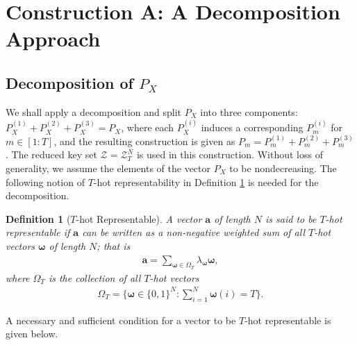 \documentclass[11pt,letterpaper]{article}
\newtheorem{definition}{\textbf{Definition}}%
\newcommand{\cZ}{\mathcal{Z}}
\begin{document}
\section{Construction A: A Decomposition Approach} \label{sec:construction_A}

\subsection{Decomposition of $P_X$}
We shall apply a decomposition and split $P_X$ into three components: $P_X^{(1)} + P_X^{(2)} + P_X^{(3)} = P_X$, where each $P_X^{(i)}$ induces a corresponding $P_m^{(i)}$ for $m \in [1:T]$, and the resulting construction is given as $P_m = P_m^{(1)} + P_m^{(2)} + P_m^{(3)}$. The reduced key set $\cZ = \cZ^N_T$ is used in this construction. Without loss of generality, we assume the elements of the vector $P_X$ to be nondecreasing. The following notion of $T$-hot representability in Definition \ref{def:T-hot-representable} is needed for the decomposition.

\begin{definition}[$T$-hot Representable] \label{def:T-hot-representable}
    A vector $\boldsymbol{a}$ of length $N$ is said to be $T$-hot representable if $\boldsymbol{a}$ can be written as a non-negative weighted sum of all $T$-hot vectors $\boldsymbol{\omega}$ of length $N$; that is
    \begin{align}
        \boldsymbol{a}= \sum_{\boldsymbol{\omega} \in \Omega_T} \lambda_{\boldsymbol{\omega}}\boldsymbol{\omega}, \label{eq:T-hot_representable}
    \end{align}
    where $\Omega_T$ is the collection of all $T$-hot vectors
    \begin{align}
        \Omega_T = \{\boldsymbol{\omega} \in \{0, 1\}^N : \sum_{i=1}^N \boldsymbol{\omega}(i) = T\}.
    \end{align} 
\end{definition}

A necessary and sufficient condition for a vector to be $T$-hot representable is given below. 
\end{document}
